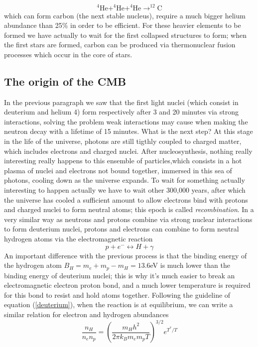 \begin{equation}
^4\mathrm{He} + ^4\mathrm{He} +^4\mathrm{He} \rightarrow ^{12}\mathrm{C}
\end{equation}
which can form carbon (the next stable nucleus), require a much bigger helium abundance than 25\% in order to be efficient. For these heavier elements to be formed we have actually to wait for the first collapsed structures to form; when the first stars are formed, carbon can be produced via thermonuclear fusion processes which occur in the core of stars. 
\subsection{The origin of the CMB}
In the previous paragraph we saw that the first light nuclei (which consist in deuterium and helium 4) form respectively after 3 and 20 minutes via strong interactions, solving the problem weak interactions may cause when making the neutron decay with a lifetime of 15 minutes. What is the next step? At this stage in the life of the universe, photons are still tigthly coupled to charged matter, which includes electrons and charged nuclei. After nucleosynthesis, nothing really interesting really happens to this ensemble of particles,which consists in a hot plasma of nuclei and electrons not bound together, immersed in this sea of photons, cooling down as the universe expands. To wait for something actually interesting to happen actually we have to wait other 300,000 years, after which the universe has cooled a sufficient amount to allow electrons bind with protons and charged nuclei to form neutral atoms; this epoch is called \textit{recombination}. In a very similar way as neutrons and protons combine via 
strong nuclear interactions to form deuterium nuclei, protons and electrons can combine to form neutral hydrogen atoms via the electromagnetic reaction
\begin{equation}
p+e^-\leftrightarrow H + \gamma
\end{equation}
An important difference with the previous process is that the binding energy of the hydrogen atom $B_H=m_e+m_p-m_H=13.6$eV is much lower than the binding energy of deuterium nuclei; this is why it's much easier to break an electromagnetic electron proton bond, and a much lower temperature is required for this bond to resist and hold atoms together. Following the guideline of equation (\ref{deuterium}), when the reaction is at equilibrium, we can write a similar relation for electron and hydrogen abundances
\begin{equation}
\frac{n_H}{n_en_p}=\left(\frac{m_Hh^2}{2\pi k_Bm_em_p T}\right)^{3/2}e^{T^*/T}
\end{equation}
